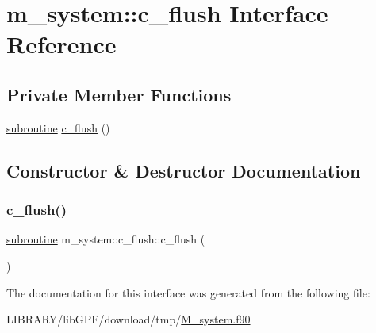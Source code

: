 \hypertarget{interfacem__system_1_1c__flush}{}\section{m\+\_\+system\+:\+:c\+\_\+flush Interface Reference}
\label{interfacem__system_1_1c__flush}
\subsection*{Private Member Functions}
\begin{DoxyCompactItemize}
\item 
\hyperlink{M__stopwatch_83_8txt_acfbcff50169d691ff02d4a123ed70482}{subroutine} \hyperlink{interfacem__system_1_1c__flush_a617b08895c68af8e223aa02cf3a1e30f}{c\+\_\+flush} ()
\end{DoxyCompactItemize}


\subsection{Constructor \& Destructor Documentation}
\mbox{\label{interfacem__system_1_1c__flush_a617b08895c68af8e223aa02cf3a1e30f}} 
\subsubsection{\texorpdfstring{c\+\_\+flush()}{c\_flush()}}
{\footnotesize\ttfamily \hyperlink{M__stopwatch_83_8txt_acfbcff50169d691ff02d4a123ed70482}{subroutine} m\+\_\+system\+::c\+\_\+flush\+::c\+\_\+flush (\begin{DoxyParamCaption}{ }\end{DoxyParamCaption})\hspace{0.3cm}{\ttfamily [private]}}



The documentation for this interface was generated from the following file\+:\begin{DoxyCompactItemize}
\item 
L\+I\+B\+R\+A\+R\+Y/lib\+G\+P\+F/download/tmp/\hyperlink{M__system_8f90}{M\+\_\+system.\+f90}\end{DoxyCompactItemize}
